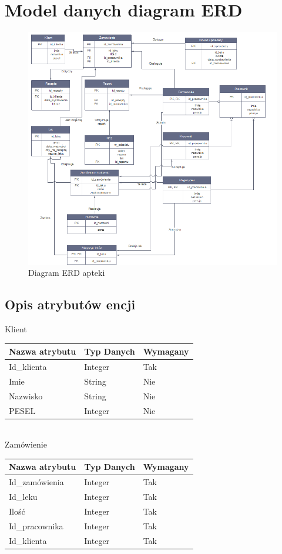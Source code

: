 \documentclass[a4paper, 11pt]{article}
\begin{document}
	\section{Model danych diagram ERD}
	
			\begin{figure}[H]
			\centerline{\includegraphics[scale=1]{ERD.png}}
			\caption{Diagram ERD apteki}
			\end{figure}
	\subsection{Opis atrybutów encji}
 Klient\\
\begin{tabular}{|l|l|l|} \hline
Nazwa  atrybutu	& Typ Danych	& Wymagany \\ \hline
Id\_klienta	& Integer	& Tak \\ \hline
Imie & 	String	& Nie \\ \hline
Nazwisko & String &	Nie \\ \hline
PESEL 	& 	Integer	& Nie \\ \hline
\end{tabular}\\[1cm]

Zamówienie\\
\begin{tabular}{|l|l|l|} \hline
Nazwa  atrybutu	& Typ Danych	& Wymagany \\ \hline
Id\_zamówienia	 &Integer	& Tak \\ \hline
Id\_leku &	Integer	& Tak\\ \hline
Ilość	& Integer	& Tak\\ \hline
Id\_pracownika &	Integer	& Tak\\ \hline
Id\_klienta &	Integer &	Tak\\ \hline
\end{tabular}\\[1cm]
	
\end{document}
